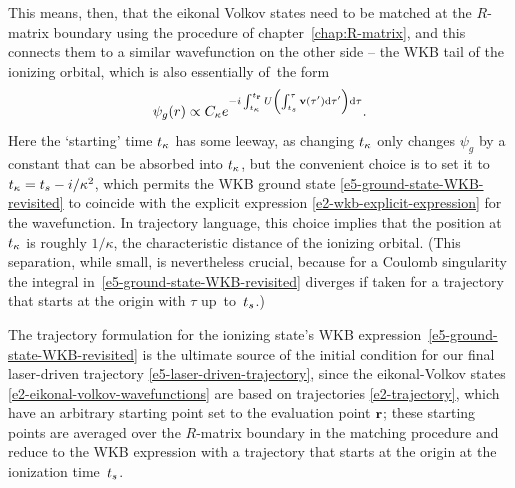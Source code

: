 This means, then, that the eikonal Volkov states need to be matched at the $R$-matrix boundary using the procedure of chapter~\ref{chap:R-matrix}, and this connects them to a similar wavefunction on the other side -- the WKB tail of the ionizing orbital, which is also essentially of~the form
\begin{equation}
\psi_g(r) \propto C_\kappa e^{-i\int_{{t_\kappa}}^{{t_{\vb{r}}}}U\left(\int_{{t_s}}^\tau \vb{v}(\tau')\mathrm{d}\tau' \right)\mathrm{d}\tau}.
\label{e5-ground-state-WKB-revisited}
\end{equation}
Here the `starting' time ${t_\kappa}$ has some leeway, as changing ${t_\kappa}$ only changes $\psi_g$ by a constant that can be absorbed into ${t_\kappa}$, but the convenient choice is to set it to ${t_\kappa}={t_s}-i/\kappa^2$, which permits the WKB ground state \eqref{e5-ground-state-WKB-revisited} to coincide with the explicit expression \eqref{e2-wkb-explicit-expression} for the wavefunction. In trajectory language, this choice implies that the position at ${t_\kappa}$ is roughly $1/\kappa$, the characteristic distance of the ionizing orbital. (This separation, while small, is nevertheless crucial, because for a Coulomb singularity the integral in~\eqref{e5-ground-state-WKB-revisited} diverges if taken for a trajectory that starts at the origin with $\tau$ up~to~${t_s}$.)

The trajectory formulation for the ionizing state's WKB expression~\eqref{e5-ground-state-WKB-revisited} is the ultimate source of the initial condition for our final laser-driven trajectory \eqref{e5-laser-driven-trajectory}, since the eikonal-Volkov states \eqref{e2-eikonal-volkov-wavefunctions} are based on trajectories \eqref{e2-trajectory}, which have an arbitrary starting point set to the evaluation point $\vb{r}$; these starting points are averaged over the $R$-matrix boundary in the matching procedure and reduce to the WKB expression with a trajectory that starts at the origin at the ionization time~${t_s}$.




%
%
%
%
%
%





